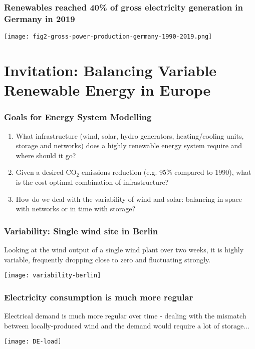 \documentclass[10pt,aspectratio=169,dvipsnames]{beamer}
\def\co2{CO${}_2$}
\let\olditem\item
\renewcommand{\item}{%
\olditem\vspace{5pt}}
\begin{document}
\begin{frame}
  \frametitle{Renewables reached 40\% of gross electricity generation in Germany in 2019}

  \centering
  \texttt{[image: fig2-gross-power-production-germany-1990-2019.png]}

\end{frame}






\section{Invitation: Balancing Variable Renewable Energy in Europe}



\begin{frame}[fragile]
  \frametitle{Goals for Energy System Modelling}

  \begin{enumerate}
  \item What \alert{infrastructure} (wind, solar, hydro generators,
    heating/cooling units, storage and networks) does a highly renewable energy system
    require and \alert{where} should it go?
  \item Given a desired \co2 emissions reduction (e.g. 95\% compared to 1990),
    what is the \alert{cost-optimal} combination of infrastructure?
  \item How do we deal with the \alert{variability} of wind and solar: balancing in space with networks or in time with storage?
  \end{enumerate}



\end{frame}


\begin{frame}
  \frametitle{Variability: Single wind site in Berlin}

  Looking at the wind output of a single wind plant over two weeks, it is highly
  variable, frequently dropping close to zero and fluctuating strongly.

  \centering
  \texttt{[image: variability-berlin]}


\end{frame}



\begin{frame}
  \frametitle{Electricity consumption is much more regular}

  Electrical demand is much more regular over time - dealing with the
  \alert{mismatch} between locally-produced wind and the demand would
  require a lot of storage...

  \centering
  \texttt{[image: DE-load]}


\end{frame}
\end{document}
